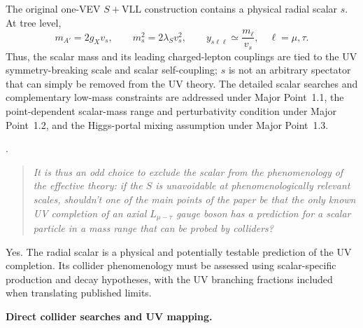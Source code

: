 \documentclass[12pt,a4paper]{article}
\begin{document}
The original one-VEV \(S+\mathrm{VLL}\) construction contains a physical radial scalar \(s\). At tree level,
\[
m_{A'}=2g_Xv_s,\qquad
m_s^2=2\lambda_Sv_s^2,\qquad
y_{s\ell\ell}\simeq\frac{m_\ell}{v_s},
\quad \ell=\mu,\tau.
\]
Thus, the scalar mass and its leading charged-lepton couplings are tied to the UV symmetry-breaking scale and scalar self-coupling; \(s\) is not an arbitrary spectator that can simply be removed from the UV theory. The detailed scalar searches and complementary low-mass constraints are addressed under Major Point~1.1, the point-dependent scalar-mass range and perturbativity condition under Major Point~1.2, and the Higgs-portal mixing assumption under Major Point~1.3.

\medskip
{}
. \begin{quote}\itshape
It is thus an odd choice to exclude the scalar from the phenomenology of the effective theory: if the \(S\) is unavoidable at phenomenologically relevant scales, shouldn't one of the main points of the paper be that the only known UV completion of an axial \(L_{\mu-\tau}\) gauge boson has a prediction for a scalar particle in a mass range that can be probed by colliders?\end{quote}

Yes. The radial scalar is a physical and potentially testable prediction of the UV completion. Its collider phenomenology must be assessed using scalar-specific production and decay hypotheses, with the UV branching fractions included when translating published limits.

\noindent\textbf{Direct collider searches and UV mapping.}
\end{document}
